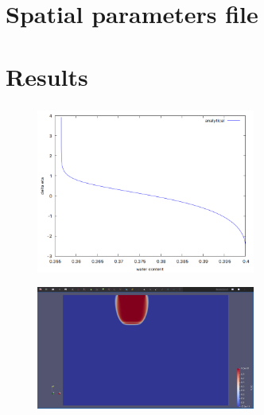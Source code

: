 \section{Spatial parameters file}
\begin{frame}[fragile]
	\frametitle{\secname} %
	\footnotesize
	\begin{minipage}{0.6\textwidth}
		
	\end{minipage}
	\begin{minipage}{0.3\textwidth}
		
	\end{minipage}
\end{frame}

\section{Results}
\begin{frame}
	\frametitle{\secname}
	\begin{minipage}{0.5\textwidth}
		\begin{figure}[ht!]
			\centering
			\includegraphics[width=7.2cm]{infiltration_theta_vs_deltaeta}
		\end{figure}
	\end{minipage}
	\begin{minipage}{0.3\textwidth}
		\begin{figure}[ht!]
			\centering
			\includegraphics[width=7.2cm]{richard_lens}
		\end{figure}
	\end{minipage}
\end{frame}